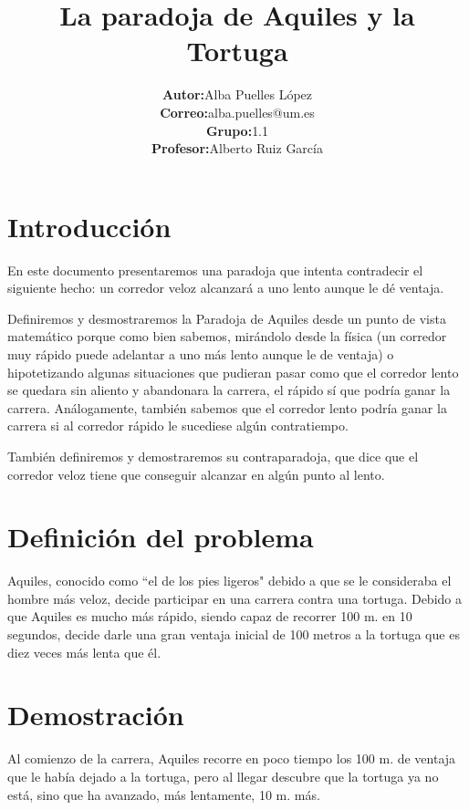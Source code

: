 \documentclass[a4paper,12pt]{article}
\date{}
\title{\textbf{La paradoja de Aquiles y la Tortuga}}
\author{\begin{tabular}{rl}
  \textbf{Autor:} & Alba Puelles López \\
  \textbf{Correo:} & alba.puelles@um.es \\
  \textbf{Grupo:} & 1.1 \\
  \textbf{Profesor:} & Alberto Ruiz García \\
\end{tabular}}
\begin{document}
 
   \maketitle
   
   \newpage

   \tableofcontents

   \newpage
   
   \section{Introducción}
   
   En este documento presentaremos una paradoja que intenta contradecir
   el siguiente hecho: un corredor veloz alcanzará a uno lento aunque le dé ventaja. 
   
   Definiremos y desmostraremos la Paradoja de Aquiles desde un punto 
   de vista matemático porque como bien sabemos, mirándolo desde la física 
   (un corredor muy rápido puede adelantar a uno más lento aunque le de ventaja) 
   o hipotetizando algunas situaciones que pudieran pasar como que el corredor 
   lento se quedara sin aliento y abandonara la carrera, el rápido sí que podría ganar 
   la carrera. Análogamente, también sabemos que el corredor lento podría ganar 
   la carrera si al corredor rápido le sucediese algún contratiempo. 
   
   También definiremos y demostraremos su contraparadoja, que dice que el 
   corredor veloz tiene que conseguir alcanzar en algún punto al lento.
   
   \section{Definición del problema}
   
   Aquiles, conocido como ``el de los pies ligeros" debido a que se le consideraba 
   el hombre más veloz, decide participar en una carrera contra una tortuga. 
   Debido a que Aquiles es mucho más rápido, siendo capaz de recorrer 100 m. en 10 segundos, 
   decide darle una gran ventaja inicial de 100 metros a la tortuga que es diez 
   veces más lenta que él. 
   
   \section{Demostración}
   
   Al comienzo de la carrera, Aquiles recorre en poco tiempo los 100 m. 
   de ventaja que le había dejado a la tortuga, pero al llegar descubre 
   que la tortuga ya no está, sino que ha avanzado, más lentamente,
   10 m. más. 
   
\end{document}
